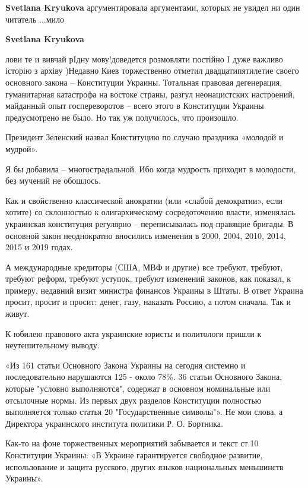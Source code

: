 \begin{itemize}
\begin{itemize}
\textbf{Svetlana Kryukova} аргументировала аргументами, которых не увидел ни один читатель ...мило

 
\textbf{Svetlana Kryukova} 

лови те и вивчай рIдну мову!доведется розмовляти постійно I дуже важливо
історію з архіву )Недавно Киев торжественно отметил двадцатипятилетие своего
основного закона – Конституции Украины. Тотальная правовая дегенерация,
гуманитарная катастрофа на востоке страны, разгул неонацистских настроений,
майданный опыт госпереворотов – всего этого в Конституции Украины предусмотрено
не было. Но так уж получилось, что произошло.

Президент Зеленский назвал Конституцию по случаю праздника «молодой и мудрой».

Я бы добавила – многострадальной. Ибо когда мудрость приходит в молодости, без мучений не обошлось.

Как и свойственно классической анократии (или «слабой демократии», если хотите)
со склонностью к олигархическому сосредоточению власти, изменялась украинская
конституция регулярно – переписывалась под правящие бригады. В основной закон
неоднократно вносились изменения в 2000, 2004, 2010, 2014, 2015 и 2019 годах.

А международные кредиторы (США, МВФ и другие) все требуют, требуют, требуют
реформ, требуют уступок, требуют изменений законов, как показал, к примеру,
недавний визит министра финансов Украины в Штаты. В ответ Украина просит,
просит и просит: денег, газу, наказать Россию, а потом сначала. Так и живут.

К юбилею правового акта украинские юристы и политологи пришли к неутешительному выводу.

«Из 161 статьи Основного Закона Украины на сегодня системно и последовательно
нарушаются 125 - около 78\%. 36 статьи Основного Закона, которые "условно
выполняются", содержат в основном номинальные или отсылочные нормы. Из первых
двух разделов Конституции полностью выполняется только статья 20
"Государственные символы"». Не мои слова, а Директора украинского института
политики Р. О. Бортника.

Как-то на фоне торжественных мероприятий забывается и текст ст.10 Конституции
Украины: «В Украине гарантируется свободное развитие, использование и защита
русского, других языков национальных меньшинств Украины».


\end{itemize}
\end{itemize}
